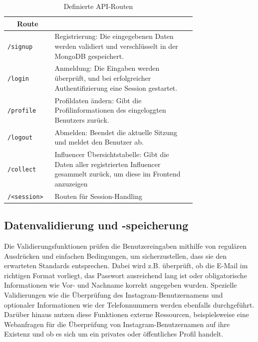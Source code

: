 \documentclass[conference,a4paper,flushend]{cs-techrep}
\begin{document}
\begin{table}[h]
    \centering
    \begin{tabular}{|l|>{\raggedright\arraybackslash}m{0.75\linewidth}|}
        \hline
  	 \multicolumn{1}{|c|}{\textbf{Route}} & \multicolumn{1}{c|}{\textbf{Zweck der Route}} \\
        \hline
        \verb|/signup| & Registrierung: Die eingegebenen Daten werden validiert und verschlüsselt in der MongoDB gespeichert. \\
        \hline
        \verb|/login| & Anmeldung: Die Eingaben werden überprüft, und bei erfolgreicher Authentifizierung eine Session gestartet. \\
        \hline
        \verb|/profile| & Profildaten ändern: Gibt die Profilinformationen des eingeloggten Benutzers zurück. \\
        \hline
        \verb|/logout| & Abmelden: Beendet die aktuelle Sitzung und meldet den Benutzer ab. \\
        \hline
        \verb|/collect| & Influencer Übersichtstabelle: Gibt die Daten aller registrierten Influencer gesammelt zurück, um diese im Frontend anzuzeigen \\
        \hline
	   \verb|/<session>| & Routen für Session-Handling \\
        \hline
    \end{tabular}
    \caption{Definierte API-Routen}
    \label{tab:api-routes}
\end{table}



\subsection{Datenvalidierung und -speicherung}
Die Validierungsfunktionen prüfen die Benutzereingaben mithilfe von regulären Ausdrücken und einfachen Bedingungen, um sicherzustellen, dass sie den erwarteten Standards entsprechen. Dabei wird z.B. überprüft, ob die E-Mail im richtigen Format vorliegt, das Passwort ausreichend lang ist oder obligatorische Informationen wie Vor- und Nachname korrekt angegeben wurden. Spezielle Validierungen wie die Überprüfung des Instagram-Benutzernamens und optionaler Informationen wie der Telefonnummern werden ebenfalls durchgeführt. Darüber hinaus nutzen diese Funktionen externe Ressourcen, beispielsweise eine Webanfragen für die Überprüfung von Instagram-Benutzernamen auf ihre Existenz und ob es sich um ein privates oder öffentliches Profil handelt. 
\end{document}
